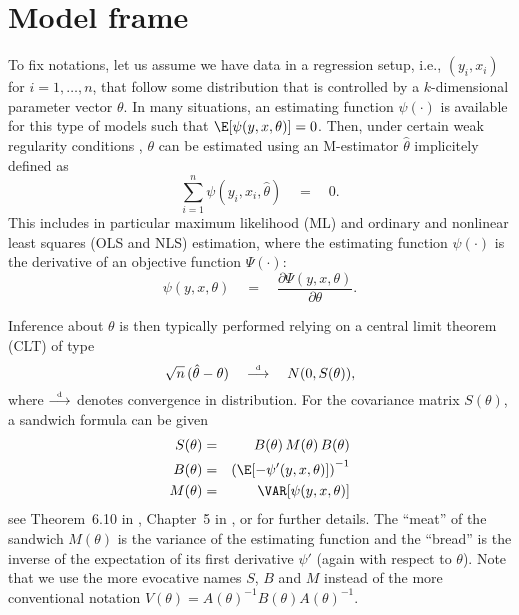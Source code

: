 \documentclass{Z}
\newcommand{\darrow}{\stackrel{\mbox{\tiny \textnormal{d}}}{\longrightarrow}}
\begin{document}
{
\section{Model frame} \label{sec:model}
\nopagebreak 

To fix notations, let us assume we have data in a regression setup, i.e., 
$(y_i, x_i)$ for $i = 1, \dots, n$, that follow some distribution that is 
controlled by a $k$-dimensional parameter vector $\theta$. In many situations,
an estimating function $\psi(\cdot)$ is available for this type of models
such that $\E[\psi(y, x, \theta)] = 0$. Then, under certain weak regularity
conditions \citep[see e.g.,][]{hac:White:1994}, 
$\theta$ can be estimated using an M-estimator $\hat \theta$ implicitely defined as
  \begin{equation} \label{eq:estfun}
    \sum_{i = 1}^n \psi(y_i, x_i, \hat \theta) \quad = \quad 0.
  \end{equation}
This includes in particular maximum likelihood (ML) and ordinary and nonlinear least
squares (OLS and NLS) estimation, where the estimating function $\psi(\cdot)$ is
the derivative of an objective function $\Psi(\cdot)$:
  \begin{equation} \label{eq:score}
    \psi(y, x, \theta) \quad = \quad \frac{\partial \Psi(y, x, \theta)}{\partial \theta}.
  \end{equation}
}

Inference about $\theta$ is then typically performed relying on a central
limit theorem (CLT) of type
  \begin{equation} \label{eq:clt}
    \sqrt{n} \, (\hat \theta - \theta) \quad \darrow \quad N(0, S(\theta)),
  \end{equation}
where $\darrow$ denotes convergence in distribution. For the covariance matrix
$S(\theta)$, a sandwich formula can be given
\begin{eqnarray} \label{eq:sandwich}
  S(\theta) & = & B(\theta) \, M(\theta) \, B(\theta) \\  \label{eq:bread}
  B(\theta) & = & \left( \E[ - \psi'(y, x, \theta) ] \right)^{-1} \\  \label{obj}
  M(\theta) & = & \VAR[ \psi(y, x, \theta) ]
\end{eqnarray}
see Theorem~6.10 in \cite{hac:White:1994}, Chapter~5 in \cite{hac:Cameron+Trivedi:2005},
or \cite{hac:Stefanski+Boos:2002} for further details.
The ``meat'' of the sandwich $M(\theta)$ is the variance of the estimating
function and the ``bread'' is the inverse of the expectation of its first derivative $\psi'$
(again with respect to $\theta$). Note that we use the more evocative names $S$,
$B$ and $M$ instead of the more conventional notation $V(\theta) = A(\theta)^{-1} B(\theta)
A(\theta)^{-1}$.
\end{document}
